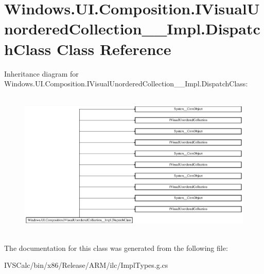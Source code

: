 \hypertarget{class_windows_1_1_u_i_1_1_composition_1_1_i_visual_unordered_collection_____impl_1_1_dispatch_class}{}\section{Windows.\+U\+I.\+Composition.\+I\+Visual\+Unordered\+Collection\+\_\+\+\_\+\+Impl.\+Dispatch\+Class Class Reference}
\label{class_windows_1_1_u_i_1_1_composition_1_1_i_visual_unordered_collection_____impl_1_1_dispatch_class}
Inheritance diagram for Windows.\+U\+I.\+Composition.\+I\+Visual\+Unordered\+Collection\+\_\+\+\_\+\+Impl.\+Dispatch\+Class\+:\begin{figure}[H]
\begin{center}
\leavevmode
\includegraphics[height=7.080460cm]{class_windows_1_1_u_i_1_1_composition_1_1_i_visual_unordered_collection_____impl_1_1_dispatch_class}
\end{center}
\end{figure}


The documentation for this class was generated from the following file\+:\begin{DoxyCompactItemize}
\item 
I\+V\+S\+Calc/bin/x86/\+Release/\+A\+R\+M/ilc/Impl\+Types.\+g.\+cs\end{DoxyCompactItemize}
